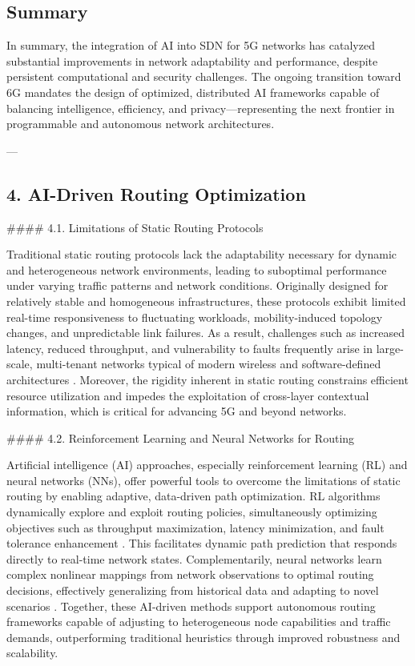\documentclass[11pt]{article}
\begin{document}
\begin{itemize}
\subsection*{Summary}

In summary, the integration of AI into SDN for 5G networks has catalyzed substantial improvements in network adaptability and performance, despite persistent computational and security challenges. The ongoing transition toward 6G mandates the design of optimized, distributed AI frameworks capable of balancing intelligence, efficiency, and privacy—representing the next frontier in programmable and autonomous network architectures.

---

\subsection{4. AI-Driven Routing Optimization}

#### 4.1. Limitations of Static Routing Protocols

Traditional static routing protocols lack the adaptability necessary for dynamic and heterogeneous network environments, leading to suboptimal performance under varying traffic patterns and network conditions. Originally designed for relatively stable and homogeneous infrastructures, these protocols exhibit limited real-time responsiveness to fluctuating workloads, mobility-induced topology changes, and unpredictable link failures. As a result, challenges such as increased latency, reduced throughput, and vulnerability to faults frequently arise in large-scale, multi-tenant networks typical of modern wireless and software-defined architectures \cite{ref53}. Moreover, the rigidity inherent in static routing constrains efficient resource utilization and impedes the exploitation of cross-layer contextual information, which is critical for advancing 5G and beyond networks.

#### 4.2. Reinforcement Learning and Neural Networks for Routing

Artificial intelligence (AI) approaches, especially reinforcement learning (RL) and neural networks (NNs), offer powerful tools to overcome the limitations of static routing by enabling adaptive, data-driven path optimization. RL algorithms dynamically explore and exploit routing policies, simultaneously optimizing objectives such as throughput maximization, latency minimization, and fault tolerance enhancement \cite{ref4}. This facilitates dynamic path prediction that responds directly to real-time network states. Complementarily, neural networks learn complex nonlinear mappings from network observations to optimal routing decisions, effectively generalizing from historical data and adapting to novel scenarios \cite{ref17}\textemdash\cite{ref20}. Together, these AI-driven methods support autonomous routing frameworks capable of adjusting to heterogeneous node capabilities and traffic demands, outperforming traditional heuristics through improved robustness and scalability.


\end{itemize}
\end{document}
